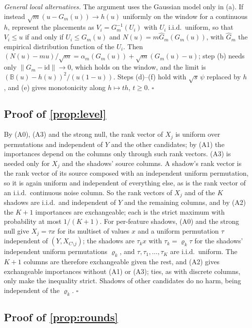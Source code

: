 \emph{General local alternatives.} The argument uses the Gaussian model only in (a). If instead $\sqrt m(u - G_m(u))\to h(u)$ uniformly on the window for a continuous $h$, represent the placements as $V_i = G_m^{-1}(U_i)$ with $U_i$ i.i.d.\ uniform, so that $V_i\le u$ if and only if $U_i\le G_m(u)$ and $N(u) = m\hat G_m(G_m(u))$, with $\hat G_m$ the empirical distribution function of the $U_i$. Then $(N(u)-mu)/\sqrt m = \alpha_m(G_m(u)) + \sqrt m(G_m(u)-u)$; step (b) needs only $\|G_m - \mathrm{id}\|\to 0$, which holds on the window, and the limit is $(\mathbb B(u) - h(u))^2/(u(1-u))$. Steps (d)--(f) hold with $\sqrt s\,\psi$ replaced by $h$, and (e) gives monotonicity along $h \mapsto t h$, $t \ge 0$. \hfill$\square$

\subsection{Proof of \texorpdfstring{\cref{prop:level}}{Proposition 4}}\label{app:proof-level}

By (A0), (A3) and the strong null, the rank vector of $X_j$ is uniform over permutations and independent of $Y$ and the other candidates; by (A1) the importances depend on the columns only through such rank vectors. (A3) is needed only for $X_j$ and the shadows' source columns. A shadow's rank vector is the rank vector of its source composed with an independent uniform permutation, so it is again uniform and independent of everything else, as is the rank vector of an i.i.d.\ continuous noise column. So the rank vectors of $X_j$ and of the $K$ shadows are i.i.d.\ and independent of $Y$ and the remaining columns, and by (A2) the $K+1$ importances are exchangeable; each is the strict maximum with probability at most $1/(K+1)$. For per-feature shadows, (A0) and the strong null give $X_j = \tau x$ for its multiset of values $x$ and a uniform permutation $\tau$ independent of $(Y, X_{C\setminus j})$; the shadows are $\tau_k x$ with $\tau_k = \varrho_k\tau$ for the shadows' independent uniform permutations $\varrho_k$, and $\tau, \tau_1, \dots, \tau_K$ are i.i.d.\ uniform. The $K+1$ columns are therefore exchangeable given the rest, and (A2) gives exchangeable importances without (A1) or (A3); ties, as with discrete columns, only make the inequality strict. Shadows of other candidates do no harm, being independent of the $\varrho_k$. \hfill$\square$

\subsection{Proof of \texorpdfstring{\cref{prop:rounds}}{Proposition 5}}\label{app:proof-rounds}

